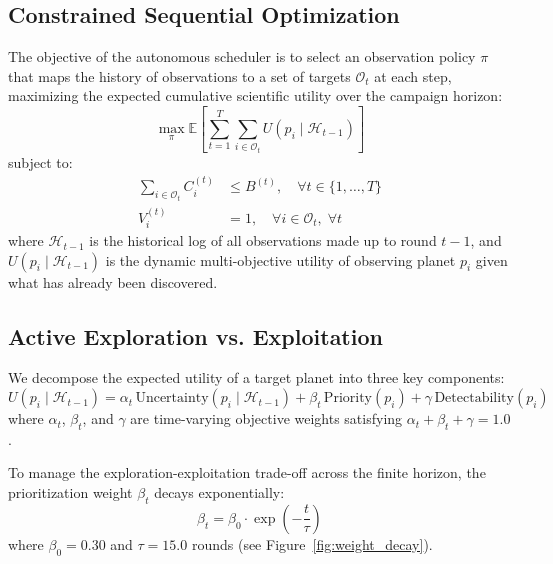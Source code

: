 \documentclass[11pt,a4paper]{article}
\begin{document}
\subsection{Constrained Sequential Optimization}

The objective of the autonomous scheduler is to select an observation policy $\pi$ that maps the history of observations to a set of targets $\mathcal{O}_t$ at each step, maximizing the expected cumulative scientific utility over the campaign horizon:
\begin{equation}
\max_{\pi} \mathbb{E} \left[ \sum_{t=1}^{T} \sum_{i \in \mathcal{O}_t} U\left(p_i \mid \mathcal{H}_{t-1}\right) \right]
\label{eq:constrained_opt}
\end{equation}
subject to:
\begin{align}
\sum_{i \in \mathcal{O}_t} C_i^{(t)} &\leq B^{(t)}, \quad \forall t \in \{1, \ldots, T\} \label{eq:budget_const} \\
V_i^{(t)} &= 1, \quad \forall i \in \mathcal{O}_t, \; \forall t \label{eq:vis_const}
\end{align}
where $\mathcal{H}_{t-1}$ is the historical log of all observations made up to round $t-1$, and $U\left(p_i \mid \mathcal{H}_{t-1}\right)$ is the dynamic multi-objective utility of observing planet $p_i$ given what has already been discovered.

\subsection{Active Exploration vs. Exploitation}

We decompose the expected utility of a target planet into three key components:
\begin{equation}
U\left(p_i \mid \mathcal{H}_{t-1}\right) = \alpha_t \, \text{Uncertainty}(p_i \mid \mathcal{H}_{t-1}) + \beta_t \, \text{Priority}(p_i) + \gamma \, \text{Detectability}(p_i)
\label{eq:utility_decomp}
\end{equation}
where $\alpha_t$, $\beta_t$, and $\gamma$ are time-varying objective weights satisfying $\alpha_t + \beta_t + \gamma = 1.0$.

To manage the exploration-exploitation trade-off across the finite horizon, the prioritization weight $\beta_t$ decays exponentially:
\begin{equation}
\beta_t = \beta_0 \cdot \exp\left(-\frac{t}{\tau}\right)
\label{eq:decay}
\end{equation}
where $\beta_0 = 0.30$ and $\tau = 15.0$ rounds (see Figure~\ref{fig:weight_decay}).
\end{document}

